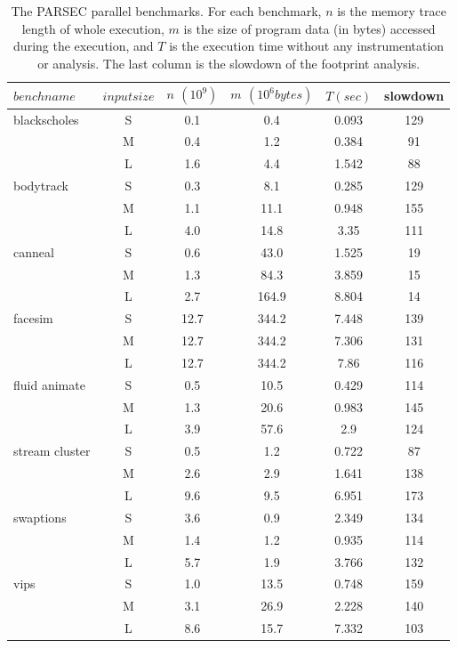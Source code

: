 \begin{table}
\small
\centering
\begin{tabular}{|l|c|c|c|c|c|}
\hline
$bench name$ & $input size$ & $n$ $(10^9)$ & $m$ $(10^6 bytes)$ & $T(sec)$ & slowdown \\ \hline \hline 
blackscholes &S& 0.1 & 0.4 & 0.093 & 129 \\ \cline{2-6}
 &M& 0.4 & 1.2 & 0.384 & 91 \\ \cline{2-6}
 &L& 1.6 & 4.4 & 1.542 & 88 \\ \hline
bodytrack &S& 0.3 & 8.1 & 0.285 & 129 \\ \cline{2-6}
 &M& 1.1 & 11.1 & 0.948 & 155 \\ \cline{2-6}
 &L& 4.0 & 14.8 & 3.35 & 111 \\ \hline
canneal &S& 0.6 & 43.0 & 1.525 & 19 \\ \cline{2-6}
 &M& 1.3 & 84.3 & 3.859 & 15 \\ \cline{2-6}
 &L& 2.7 & 164.9 & 8.804 & 14 \\ \hline
facesim &S& 12.7 & 344.2 & 7.448 & 139 \\ \cline{2-6}
 &M& 12.7 & 344.2 & 7.306 & 131 \\ \cline{2-6}
 &L& 12.7 & 344.2 & 7.86 & 116 \\ \hline
fluid animate &S& 0.5 & 10.5 & 0.429 & 114 \\ \cline{2-6}
 &M& 1.3 & 20.6 & 0.983 & 145 \\ \cline{2-6}
 &L& 3.9 & 57.6 & 2.9 & 124 \\ \hline
stream cluster &S& 0.5 & 1.2 & 0.722 & 87 \\ \cline{2-6}
 &M& 2.6 & 2.9 & 1.641 & 138 \\ \cline{2-6}
 &L& 9.6 & 9.5 & 6.951 & 173 \\ \hline
swaptions &S& 3.6 & 0.9 & 2.349 & 134 \\ \cline{2-6}
 &M& 1.4 & 1.2 & 0.935 & 114 \\ \cline{2-6}
 &L& 5.7 & 1.9 & 3.766 & 132 \\ \hline
vips &S& 1.0 & 13.5 & 0.748 & 159 \\ \cline{2-6}
 &M& 3.1 & 26.9 & 2.228 & 140 \\ \cline{2-6}
 &L& 8.6 & 15.7 & 7.332 & 103 \\ \hline
\end{tabular}
\caption{The PARSEC parallel benchmarks. 
  For each benchmark, $n$ is the memory trace length of whole execution, $m$ is 
  the size of program data (in bytes) accessed during the execution, and $T$ is the
  execution time without any instrumentation or analysis.  The last
  column is the slowdown of
  the footprint analysis.}
\label{tbl:parsec_basic}
\end{table}


